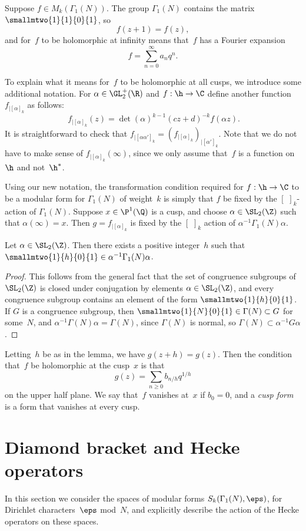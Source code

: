 \documentclass{report}
\begin{document}
Suppose $f\in M_k(\Gamma_1(N))$. The group $\Gamma_1(N)$ contains
the matrix $\smallmtwo{1}{1}{0}{1}$, so $$f(z+1)=f(z),$$ and
for~$f$ to be holomorphic at infinity means that~$f$ has a Fourier
expansion
\[
   f = \sum_{n=0}^{\infty} a_n q^n.
\]

To explain what it means for~$f$ to be holomorphic at all cusps,
we introduce some additional notation.  For
$\alpha\in\GL_2^{+}(\R)$ and $f:\h\to\C$ define another function
$f_{|[\alpha]_k}$ as follows:
\[\
   f_{|[\alpha]_k}(z) = \det(\alpha)^{k-1} (cz+d)^{-k}
   f(\alpha{}z).
\]
It is straightforward to check that $f_{|[\alpha\alpha']_k} =
(f_{|[\alpha]_k})_{|[\alpha']_k}$.  Note that we do not have to
make sense of $f_{|[\alpha]_k}(\infty)$, since we only assume
that~$f$ is a function on~$\h$ and not~$\h^*$.

Using our new notation, the transformation condition required for
$f:\h\to\C$ to be a modular form for $\Gamma_1(N)$ of weight~$k$
is simply that $f$ be fixed by the $[\,\,]_k$-action of
$\Gamma_1(N)$. Suppose $x\in\P^1(\Q)$ is a cusp, and choose
$\alpha\in\SL_2(\Z)$ such that $\alpha(\infty)=x$. Then
$g=f_{|[\alpha]_k}$ is fixed by the $[\,\,]_k$ action of
$\alpha^{-1}\Gamma_1(N)\alpha$.
\begin{lemma}
Let $\alpha\in\SL_2(\Z)$.  Then there exists a positive
integer~$h$ such that
$\smallmtwo{1}{h}{0}{1}\in\alpha^{-1}\Gamma_1(N)\alpha$.
\end{lemma}
\begin{proof}
This follows from the general fact that the set of congruence
subgroups of $\SL_2(\Z)$ is closed under conjugation by elements
$\alpha \in \SL_2(\Z)$, and every congruence subgroup contains an
element of the form $\smallmtwo{1}{h}{0}{1}$.   If $G$ is a
congruence subgroup, then $\smallmtwo{1}{N}{0}{1} \in \Gamma(N)\subset G$ for some~$N$, and
$\alpha^{-1}\Gamma(N)\alpha=\Gamma(N)$, since $\Gamma(N)$ is
normal, so $\Gamma(N)\subset \alpha^{-1} G \alpha$.
\end{proof}

Letting~$h$ be as in the lemma, we have $g(z+h)=g(z)$. Then the
condition that~$f$ be holomorphic at the cusp~$x$ is that
\[
   g(z) = \sum_{n\geq 0} b_{n/h} q^{1/h}
\]
on the upper half plane.  We say that~$f$ vanishes at~$x$ if
$b_{0}=0$, and a {\em cusp form} is a form that vanishes at every cusp.

\section{Diamond bracket and Hecke operators}
In this section we consider the spaces of modular forms
$S_k(\Gamma_1(N),\eps)$,
for Dirichlet characters~$\eps$ mod~$N$, and explicitly
describe the action of the Hecke operators
on these spaces.
\end{document}
